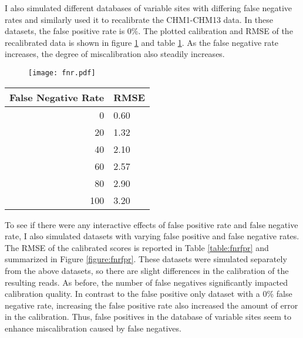 I also simulated different databases of variable sites with differing false negative rates and similarly used it to recalibrate the CHM1-CHM13 data. In these datasets, the false positive rate is 0\%. The plotted calibration and RMSE of the recalibrated data is shown in figure \ref{figure:fnr} and table \ref{table:fnr}. As the false negative rate increases, the degree of miscalibration also steadily increases.

\begin{figure}
	\centering
	\texttt{[image: fnr.pdf]}
	\label{figure:fnr}
\end{figure}

\begin{table}
\centering
\begin{tabular}{r l}
\toprule
False Negative Rate & RMSE \\
\midrule
0 & 0.60 \\
20 & 1.32 \\
40 & 2.10 \\
60 & 2.57 \\
80 & 2.90 \\
100 & 3.20 \\
\bottomrule
\end{tabular}
\label{table:fnr}
\end{table}

To see if there were any interactive effects of false positive rate and false negative rate, I also simulated datasets with varying false positive and false negative rates. The RMSE of the calibrated scores is reported in Table \ref{table:fnrfpr} and summarized in Figure \ref{figure:fnrfpr}. These datasets were simulated separately from the above datasets, so there are slight differences in the calibration of the resulting reads.
As before, the number of false negatives significantly impacted calibration quality. In contrast to the false positive only dataset with a 0\% false negative rate, increasing the false positive rate also increased the amount of error in the calibration. Thus, false positives in the database of variable sites seem to enhance miscalibration caused by false negatives.

